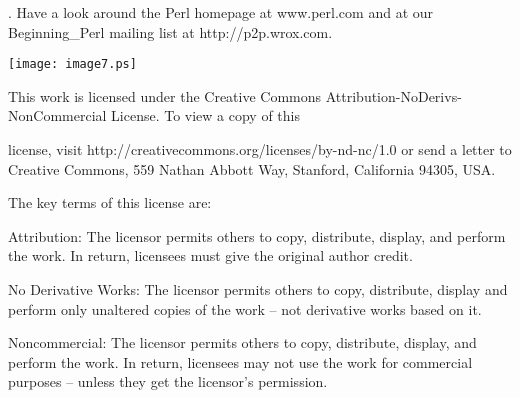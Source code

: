 \documentclass[a4paper,11pt]{book}
\begin{document}
\noindent 

.  Have a look around the Perl homepage at www.perl.com and at our Beginning\_Perl mailing list at http://p2p.wrox.com.

\noindent 

\noindent 

\noindent 

\noindent 

\noindent 

\noindent \texttt{[image: image7.ps]}

\noindent 

\noindent This work is licensed under the Creative Commons Attribution-NoDerivs-NonCommercial License. To view a copy of this

\noindent license, visit http://creativecommons.org/licenses/by-nd-nc/1.0 or send a letter to Creative Commons, 559 Nathan Abbott Way, Stanford, California 94305, USA.

\noindent 

\noindent The key terms of this license are:

\noindent 

\noindent Attribution: The licensor permits others to copy, distribute, display, and perform the work. In return, licensees must give the original author credit.

\noindent 

\noindent No Derivative Works: The licensor permits others to copy, distribute, display and perform only unaltered copies of the work -- not derivative works based on it.

\noindent 

\noindent Noncommercial: The licensor permits others to copy, distribute, display, and perform the work. In return, licensees may not use the work for commercial purposes -- unless they get the licensor's permission.
\end{document}
